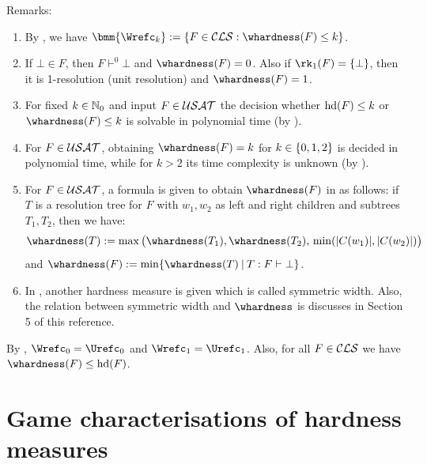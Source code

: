 \documentclass{report}
\begin{document}
Remarks:
  \begin{enumerate}
  \item By \cite{BeyersdorffKullmann2014PHP}, we have $\bmm{\Wrefc_k}:= \set{F \in \Cls : \whardness(F) \le k}$. 
  \item If $\bot \in F$, then $F \vdash^0 \bot$ and $\whardness(F)=0$. Also if $\rk_1(F)=\set{\bot}$, then it is 1-resolution (unit resolution) and  $\whardness(F)=1$.
  \item For fixed $k \in \mathbb{N}_0$ and input $F \in \mathcal{USAT}$ the decision whether $\operatorname{hd}(F) \le k$ or $\whardness(F) \le k$ is solvable in polynomial time (by \cite{BeyersdorffKullmann2014PHP}). 
  \item For $F \in \mathcal{USAT}$, obtaining $\whardness(F) = k$ for $k \in \{ 0,1,2 \}$ is decided in polynomial time, while for $k > 2$ its time complexity is unknown (by \cite{GwynneKullmann2013GoodRepresentationsIIex}).
  \item For $F \in \mathcal{USAT}$, a formula is given to obtain $\whardness(F)$ in \cite{BeyersdorffGwynneKullmann2013PHPER} as follows: if $T$ is a resolution tree for $F$ with $w_1, w_2$ as left and right children and subtrees $T_1, T_2$, then we have:
  \begin{displaymath}
  \whardness(T) := \max \big (\whardness(T_1), \whardness(T_2), \, \min(\abs{C(w_1)}, \abs{C(w_2)}) \big )
  \end{displaymath}
  and $\whardness(F) := \min \set{\whardness(T) \mb T : F \vdash \bot}$.
  \item In \cite{BeyersdorffGwynneKullmann2013PHPER}, another hardness measure is given which is called symmetric width. Also, the relation between symmetric width and $\whardness$ is discusses in Section 5 of this reference.
  \end{enumerate}
  
\begin{lem}\label{lem:hd-whd}
By \cite{BeyersdorffKullmann2014PHP}, $\Wrefc_0 = \Urefc_0$ and $\Wrefc_1 = \Urefc_1$. Also, for all $F \in \mathcal{CLS}$ we have $\whardness(F) \le \hardness(F)$.
\end{lem}
\section{Game characterisations of hardness measures}
\label{sec:game-pd}
\end{document}
